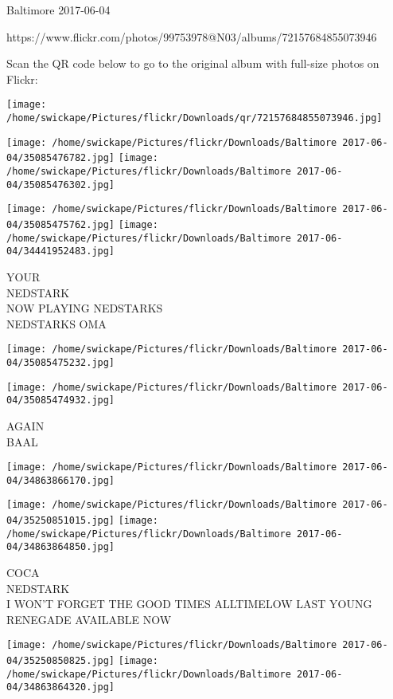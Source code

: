 \documentclass[10pt,letterpaper]{article}
\begin{document}
Baltimore 2017-06-04

https://www.flickr.com/photos/99753978@N03/albums/72157684855073946

Scan the QR code below to go to the original album with full-size photos on Flickr:

\texttt{[image: /home/swickape/Pictures/flickr/Downloads/qr/72157684855073946.jpg]}
\pagebreak

\texttt{[image: /home/swickape/Pictures/flickr/Downloads/Baltimore 2017-06-04/35085476782.jpg]}
\texttt{[image: /home/swickape/Pictures/flickr/Downloads/Baltimore 2017-06-04/35085476302.jpg]}

\texttt{[image: /home/swickape/Pictures/flickr/Downloads/Baltimore 2017-06-04/35085475762.jpg]}
\texttt{[image: /home/swickape/Pictures/flickr/Downloads/Baltimore 2017-06-04/34441952483.jpg]}

YOUR\\
NEDSTARK\\
NOW PLAYING NEDSTARKS\\
NEDSTARKS OMA
\pagebreak

\texttt{[image: /home/swickape/Pictures/flickr/Downloads/Baltimore 2017-06-04/35085475232.jpg]}

\vspace{0.25in}
\texttt{[image: /home/swickape/Pictures/flickr/Downloads/Baltimore 2017-06-04/35085474932.jpg]}

AGAIN\\
BAAL
\pagebreak

\texttt{[image: /home/swickape/Pictures/flickr/Downloads/Baltimore 2017-06-04/34863866170.jpg]}

\vspace{0.25in}
\texttt{[image: /home/swickape/Pictures/flickr/Downloads/Baltimore 2017-06-04/35250851015.jpg]}
\texttt{[image: /home/swickape/Pictures/flickr/Downloads/Baltimore 2017-06-04/34863864850.jpg]}

COCA\\
NEDSTARK\\
I WON'T FORGET THE GOOD TIMES ALLTIMELOW LAST YOUNG RENEGADE AVAILABLE NOW
\pagebreak

\texttt{[image: /home/swickape/Pictures/flickr/Downloads/Baltimore 2017-06-04/35250850825.jpg]}
\texttt{[image: /home/swickape/Pictures/flickr/Downloads/Baltimore 2017-06-04/34863864320.jpg]}
\end{document}
